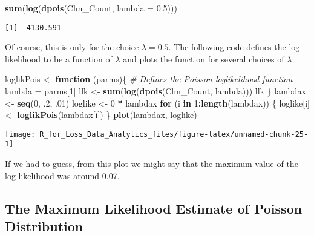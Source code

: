 \documentclass[]{book}
\newenvironment{Shaded}{\begin{snugshade}}{\end{snugshade}}
\newcommand{\KeywordTok}[1]{\textcolor[rgb]{0.13,0.29,0.53}{\textbf{#1}}}
\newcommand{\DataTypeTok}[1]{\textcolor[rgb]{0.13,0.29,0.53}{#1}}
\newcommand{\DecValTok}[1]{\textcolor[rgb]{0.00,0.00,0.81}{#1}}
\newcommand{\FloatTok}[1]{\textcolor[rgb]{0.00,0.00,0.81}{#1}}
\newcommand{\StringTok}[1]{\textcolor[rgb]{0.31,0.60,0.02}{#1}}
\newcommand{\CommentTok}[1]{\textcolor[rgb]{0.56,0.35,0.01}{\textit{#1}}}
\newcommand{\ControlFlowTok}[1]{\textcolor[rgb]{0.13,0.29,0.53}{\textbf{#1}}}
\newcommand{\OperatorTok}[1]{\textcolor[rgb]{0.81,0.36,0.00}{\textbf{#1}}}
\newcommand{\NormalTok}[1]{#1}
\theoremstyle{definition}
\theoremstyle{definition}
\theoremstyle{definition}
\theoremstyle{remark}
\begin{document}
\begin{Shaded}
\begin{Highlighting}[]
\KeywordTok{sum}\NormalTok{(}\KeywordTok{log}\NormalTok{(}\KeywordTok{dpois}\NormalTok{(Clm_Count, }\DataTypeTok{lambda =} \FloatTok{0.5}\NormalTok{)))}
\end{Highlighting}
\end{Shaded}

\begin{verbatim}
[1] -4130.591
\end{verbatim}

Of course, this is only for the choice \(\lambda = 0.5\). The following
code defines the log likelihood to be a function of \(\lambda\) and
plots the function for several choices of \(\lambda\):

\begin{Shaded}
\begin{Highlighting}[]
\NormalTok{loglikPois <-}\StringTok{ }\ControlFlowTok{function}\NormalTok{ (parms)\{ }
\CommentTok{# Defines the Poisson loglikelihood function  }
\NormalTok{  lambda =}\StringTok{ }\NormalTok{parms[}\DecValTok{1}\NormalTok{]}
\NormalTok{  llk <-}\StringTok{ }\KeywordTok{sum}\NormalTok{(}\KeywordTok{log}\NormalTok{(}\KeywordTok{dpois}\NormalTok{(Clm_Count, lambda)))}
\NormalTok{  llk}
\NormalTok{\} }
\NormalTok{lambdax <-}\StringTok{ }\KeywordTok{seq}\NormalTok{(}\DecValTok{0}\NormalTok{, .}\DecValTok{2}\NormalTok{, .}\DecValTok{01}\NormalTok{)}
\NormalTok{loglike <-}\StringTok{ }\DecValTok{0} \OperatorTok{*}\StringTok{ }\NormalTok{lambdax}
\ControlFlowTok{for}\NormalTok{ (i }\ControlFlowTok{in} \DecValTok{1}\OperatorTok{:}\KeywordTok{length}\NormalTok{(lambdax)) }
\NormalTok{  \{}
\NormalTok{  loglike[i] <-}\StringTok{ }\KeywordTok{loglikPois}\NormalTok{(lambdax[i])}
\NormalTok{\}}
\KeywordTok{plot}\NormalTok{(lambdax, loglike)}
\end{Highlighting}
\end{Shaded}

\begin{center}\texttt{[image: R\_for\_Loss\_Data\_Analytics\_files/figure-latex/unnamed-chunk-25-1]} \end{center}

If we had to guess, from this plot we might say that the maximum value
of the log likelihood was around 0.07.

\subsection{The Maximum Likelihood Estimate of Poisson
Distribution}\label{the-maximum-likelihood-estimate-of-poisson-distribution}
\end{document}

